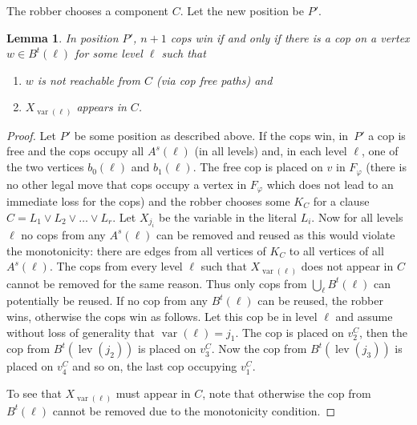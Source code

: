 \documentclass[authoryear]{article}
\newtheorem{lemma}[theorem]{Lemma}
\theoremstyle{definition}
\DeclareMathOperator{\var}{var}
\DeclareMathOperator{\lev}{lev}
\renewcommand{\phi}{\varphi}
\newcommand{\0}{\emptyset}
\begin{document}
The robber
chooses a component $C$. Let the new position be $P'$.
\begin{lemma}\label{lemma:use_one_cop}
  In position $P'$, $n+1$ cops win if and only if there is a
  cop on a vertex $w\in B^t(\ell)$ for some level $\ell$ such that
  \begin{enumerate}
  \item $w$ is not reachable from $C$ (via cop free
    paths) and 
  \item $X_{\var(\ell)}$ appears in $C$.
  \end{enumerate}
\end{lemma}
\begin{proof}
  Let $P'$ be some position as described above. If the cops
  win, in~$P'$ a cop is free  and
  the cops occupy all $A^s(\ell)$ (in all levels) and, in each level
  $\ell$, one of the two vertices $b_0(\ell)$ and $b_1(\ell)$. The
  free cop is placed on $v$ in $F_\phi$ (there is no other legal move
  that cops occupy a vertex in $F_\phi$ which does not lead to an immediate loss for the cops)
  and the robber chooses some $K_C$ for a clause
  $C=L_1 \lor L_2 \lor {}\ldots {}\lor L_r$. Let $X_{j_i}$ be the variable in
  the literal $L_i$. Now for all levels $\ell$ no cops from any
  $A^s(\ell)$ can be removed and reused as this would violate the
  monotonicity: there are edges from all vertices of $K_C$ to all
  vertices of all $A^s(\ell)$. The cops from every level $\ell$ such
  that $X_{\var (\ell)}$ does not appear in $C$ cannot be removed for
  the same reason. Thus only cops from $\bigcup_\ell B^t(\ell)$ can
  potentially be reused. If no cop from any $B^t(\ell)$ can be reused,
  the robber wins, otherwise the cops win as follows. Let this cop be
  in level $\ell$ and assume without loss of generality that
  $\var (\ell) = j_1$. The cop is placed on $v_2^C$, then the cop from
  $B^t(\lev(j_2))$ is placed on $v_3^C$. Now the cop from
  $B^t(\lev(j_3))$ is placed on $v_4^C$ and so on, the last cop
  occupying $v_1^C$.

  To see that $X_{\var(\ell)}$ must appear in $C$, note that otherwise the cop
  from $B^t(\ell)$ cannot be removed due to the monotonicity condition.
\end{proof}
\end{document}
